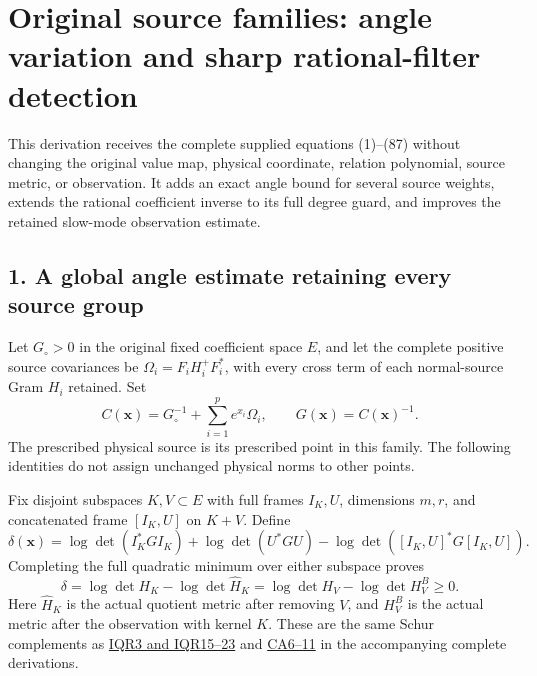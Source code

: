 \section{Original source families: angle variation and sharp rational-filter detection}\label{original-source-families-angle-variation-and-sharp-rational-filter-detection}

This derivation receives the complete supplied equations (1)--(87) without changing the original value map, physical coordinate, relation polynomial, source metric, or observation. It adds an exact angle bound for several source weights, extends the rational coefficient inverse to its full degree guard, and improves the retained slow-mode observation estimate.

\subsection{1. A global angle estimate retaining every source group}\label{a-global-angle-estimate-retaining-every-source-group}

Let \(G_\circ>0\) in the original fixed coefficient space \(E\), and let the complete positive source covariances be \(\Omega_i=F_iH_i^+F_i^*\), with every cross term of each normal-source Gram \(H_i\) retained. Set \[
C(\mathbf x)=G_\circ^{-1}+\sum_{i=1}^p e^{x_i}\Omega_i,\qquad
G(\mathbf x)=C(\mathbf x)^{-1}.                                      \tag{UFR1}
\] The prescribed physical source is its prescribed point in this family. The following identities do not assign unchanged physical norms to other points.

Fix disjoint subspaces \(K,V\subset E\) with full frames \(I_K,U\), dimensions \(m,r\), and concatenated frame \([I_K,U]\) on \(K+V\). Define \[
\delta(\mathbf x)=
\log\det(I_K^*GI_K)+\log\det(U^*GU)
-\log\det([I_K,U]^*G[I_K,U]).                                      \tag{UFR2}
\] Completing the full quadratic minimum over either subspace proves \[
\delta=\log\det H_K-\log\det\widehat H_K
       =\log\det H_V-\log\det H_V^B\ge0.                           \tag{UFR3}
\] Here \(\widehat H_K\) is the actual quotient metric after removing \(V\), and \(H_V^B\) is the actual metric after the observation with kernel \(K\). These are the same Schur complements as \href{https://github.com/KokunoYumeto/zeta-function-research-reader/blob/ab120cf974feb26a31d77b07458b6da52f912ea4/workbenches/splitzero-tandem/continuations/20260921-inverse-quotient/INVERSE_QUOTIENT_RECEIVERS.tex}{IQR3 and IQR15--23} and \href{https://github.com/KokunoYumeto/zeta-function-research-reader/blob/ab120cf974feb26a31d77b07458b6da52f912ea4/workbenches/splitzero-tandem/continuations/20260921-inverse-quotient/INDEPENDENT_COVARIANCE_ANGLE.md}{CA6--11} in the accompanying complete derivations.

